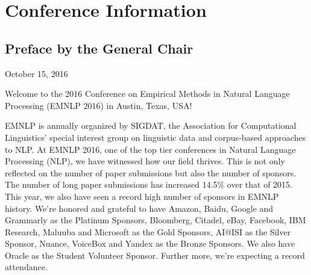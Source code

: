 
\chapter{Conference Information}


\section{Preface by the General Chair}

\begin{flushright}
October 15, 2016 
\par\end{flushright}

Welcome to the 2016 Conference on Empirical Methods in Natural Language Processing (EMNLP 2016) in Austin, Texas, USA!

EMNLP is annually organized by SIGDAT, the Association for Computational
Linguistics' special interest group on linguistic data and corpus-based approaches to NLP. At EMNLP 2016, one of the top tier conferences in Natural Language Processing (NLP), we have witnessed how our field thrives. This is not only reflected on the number of paper submissions but also the number of sponsors. The number of long paper submissions has increased 14.5\% over that of 2015. This year, we also have seen a record high number of sponsors in EMNLP history. We're honored and grateful to have Amazon, Baidu, Google and Grammarly as the Platinum Sponsors, Bloomberg, Citadel, eBay, Facebook, IBM Research, Maluuba and Microsoft as the Gold Sponsors, AI@ISI as the Silver Sponsor, Nuance, VoiceBox and Yandex as the Bronze Sponsors. We also have Oracle as the Student Volunteer Sponsor. Further more, we're expecting a record attendance. 

